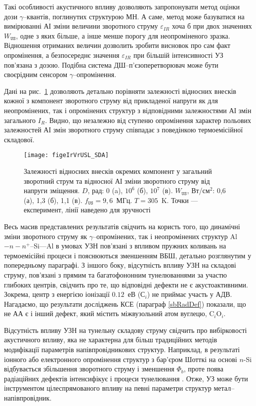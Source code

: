Такі особливості акустичного впливу дозволяють запропонувати метод оцінки дози $\gamma$--квантів, поглинутих структурою МН.
А саме, метод може базуватися на вимірюванні АІ зміни величини зворотного струму $\varepsilon_{IR}$ хоча б при двох значеннях $W_\mathtt{US}$,
одне з яких більше, а інше менше порогу для неопроміненого зразка.
Відношення отриманих величин дозволить зробити висновок про сам факт опромінення,
а безпосереднє значення $\varepsilon_{IR}$ при більшій інтенсивності УЗ пов’язана з дозою.
Подібна система ДШ--п’єзоперетворювач може бути своєрідним сенсором $\gamma$--опромінення.

Дані на рис.~\ref{figeIrVrUSL_SDA} дозволяють детально порівняти залежності відносних внесків кожної з компонент зворотного струму від прикладеної напруги
як для неопромінених, так і опромінених структур з відповідними залежностями АІ змін загального $I_R$.
Видно, що незалежно від ступеню опромінення характер польових залежностей АІ змін зворотного струму співпадає з поведінкою термоемісійної складової.


\begin{figure}
\center
\texttt{[image: figeIrVrUSL\_SDA]}
\caption{\label{figeIrVrUSL_SDA}
Залежності відносних внесків окремих компонент у загальний зворотний струм
та відносної АІ зміни зворотного струму від напруги зміщення.
$D$, рад: 0 (a), $10^6$ (б), $10^7$ (в).
$W_\mathtt{US}$, Вт/см$^2$: 0,6 (а), 1,3 (б), 1,1 (в).
$f_\mathtt{US}=9,6$~МГц.
$T=305$~K.
Точки --- експеримент,
лінії наведено для зручності
}%
\end{figure}


Весь масив представлених результатів свідчить на користь того, що
динамічні зміни зворотного струму як $\gamma$--опромінених, так і неопромінених структур Al$-n-n^+$--Si---Al в умовах УЗН
пов’язані з впливом пружних коливань на термоемісійні процеси і пояснюються зменшенням ВБШ, детально розглянутим у попередньому параграфі.
З іншого боку, відсутність впливу УЗН на складові струму, пов’язані з прямим та багатофононним тунелюваннями за участю глибоких центрів,
свідчить про те, що відповідні дефекти не є акустоактивними.
Зокрема, центр з енергією іонізації $0.12$~еВ (С$_i$) не приймає участь у АДВ.
Нагадаємо, що результати досліджень КСЕ (параграф \ref{sbRadDef}) показали, що не АА є і інший дефект, який містить міжвузольний атом вуглецю, C$_i$O$_i$.

Відсутність впливу УЗН на тунельну складову струму свідчить про вибірковості акустичного впливу, яка не характерна для більш традиційних методів модифікації параметрів напівпровідникових структур.
Наприклад, в результаті іонного або електронного опромінення структур з бар'єром Шотткі на основі $n$-Si відбувається збільшення зворотного струму
і зменшення $\Phi_b$,
проте поява радіаційних дефектів інтенсифікує і процеси тунелювання \cite{Kumar2,Rao,SINGH2001}.
Отже, УЗ може бути інструментом цілеспрямованого впливу на певні параметри структур метал--напівпровідник.


